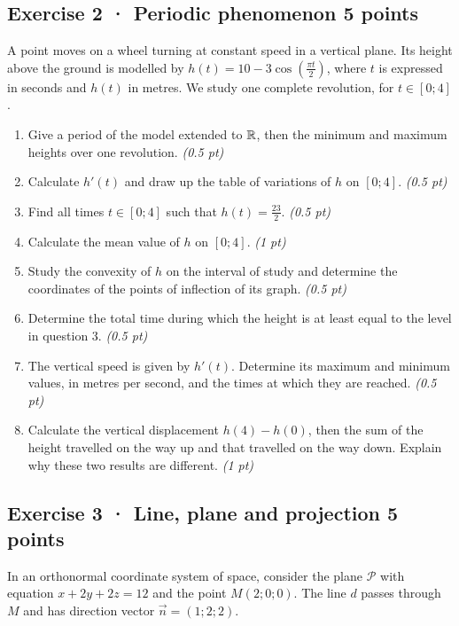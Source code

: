 \subsection*{Exercise 2 · Periodic phenomenon \hfill 5 points}A point moves on a wheel turning at constant speed in a vertical plane. Its height above the ground is modelled by $h(t)=10-3\cos\left(\frac{\pi t}{2}\right)$, where $t$ is expressed in seconds and $h(t)$ in metres. We study one complete revolution, for $t\in[0;4]$.

\begin{enumerate}

\item Give a period of the model extended to $\mathbb R$, then the minimum and maximum heights over one revolution. \hfill\textit{(0.5 pt)}

\item Calculate $h'(t)$ and draw up the table of variations of $h$ on $[0;4]$. \hfill\textit{(0.5 pt)}

\item Find all times $t\in[0;4]$ such that $h(t)=\frac{23}{2}$. \hfill\textit{(0.5 pt)}

\item Calculate the mean value of $h$ on $[0;4]$. \hfill\textit{(1 pt)}

\item Study the convexity of $h$ on the interval of study and determine the coordinates of the points of inflection of its graph. \hfill\textit{(0.5 pt)}

\item Determine the total time during which the height is at least equal to the level in question 3. \hfill\textit{(0.5 pt)}

\item The vertical speed is given by $h'(t)$. Determine its maximum and minimum values, in metres per second, and the times at which they are reached. \hfill\textit{(0.5 pt)}

\item Calculate the vertical displacement $h(4)-h(0)$, then the sum of the height travelled on the way up and that travelled on the way down. Explain why these two results are different. \hfill\textit{(1 pt)}

\end{enumerate}

\clearpage{}\par

\subsection*{Exercise 3 · Line, plane and projection \hfill 5 points}In an orthonormal coordinate system of space, consider the plane $\mathcal P$ with equation $x+2y+2z=12$ and the point $M(2;0;0)$. The line $d$ passes through $M$ and has direction vector $\vec n=(1;2;2)$.

